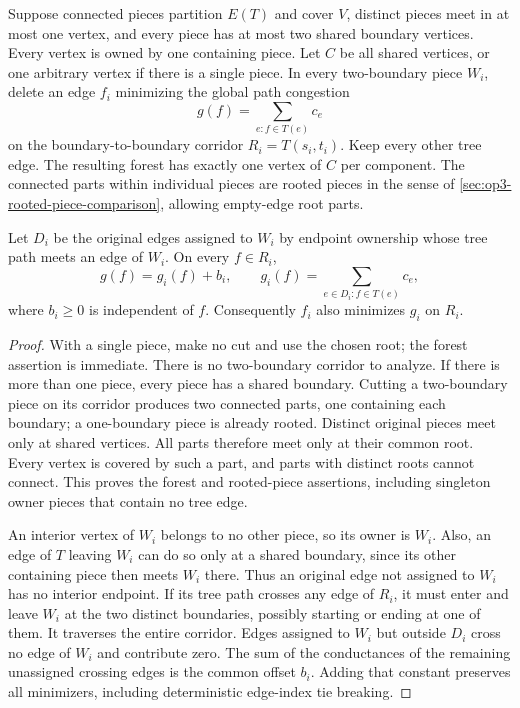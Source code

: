\begin{lemma}
\label{lem:op3-corridor-common-offset}
Suppose connected pieces partition $E(T)$ and cover $V$, distinct pieces
meet in at most one vertex, and every piece has at most two shared
boundary vertices. Every vertex is owned by one containing piece.
Let $C$ be all shared vertices, or one arbitrary vertex if there is a
single piece. In every two-boundary piece $W_i$, delete an edge $f_i$
minimizing the global path congestion
\[
 g(f)=\sum_{e:f\in T(e)}c_e
\]
on the boundary-to-boundary corridor $R_i=T(s_i,t_i)$.
Keep every other tree edge. The resulting forest has exactly one
vertex of $C$ per component. The connected parts within individual
pieces are rooted pieces in the sense of
\cref{sec:op3-rooted-piece-comparison}, allowing empty-edge root parts.

Let $D_i$ be the original edges assigned to $W_i$ by endpoint ownership
whose tree path meets an edge of $W_i$. On every $f\in R_i$,
\[
 g(f)=g_i(f)+b_i,\qquad
 g_i(f)=\sum_{e\in D_i:f\in T(e)}c_e,
\]
where $b_i\geq0$ is independent of $f$. Consequently $f_i$ also
minimizes $g_i$ on $R_i$.
\end{lemma}
\begin{proof}
With a single piece, make no cut and use the chosen root; the forest
assertion is immediate. There is no two-boundary corridor to analyze.
If there is more than one piece, every piece has a shared boundary.
Cutting a two-boundary piece on its corridor produces two connected
parts, one containing each boundary; a one-boundary piece is already
rooted. Distinct original pieces meet only at shared vertices.
All parts therefore meet only at their common root. Every vertex is
covered by such a part, and parts with distinct roots cannot connect.
This proves the forest and rooted-piece assertions, including singleton
owner pieces that contain no tree edge.

An interior vertex of $W_i$ belongs to no other piece, so its owner is
$W_i$. Also, an edge of $T$ leaving $W_i$ can do so only at a shared
boundary, since its other containing piece then meets $W_i$ there.
Thus an original edge not assigned to $W_i$ has no interior endpoint.
If its tree path crosses any edge of $R_i$, it must enter and leave
$W_i$ at the two distinct boundaries, possibly starting or ending at
one of them. It traverses the entire corridor. Edges assigned to
$W_i$ but outside $D_i$ cross no edge of $W_i$ and contribute zero.
The sum of the conductances of the remaining unassigned crossing edges
is the common offset $b_i$. Adding that constant preserves all
minimizers, including deterministic edge-index tie breaking.
\end{proof}

